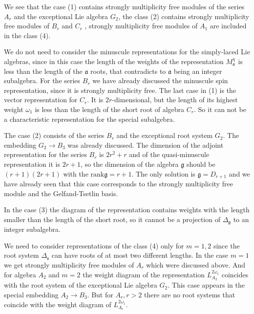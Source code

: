 \documentclass[12pt]{iopart}
\newcommand{\gf}{\mathfrak{g}}
\newcommand{\af}{\mathfrak{a}}
\newcommand{\sfr}{\mathfrak{s}}
\begin{document}
We see that the case (1) contains strongly multiplicity free modules of the series $A_{r}$ and the exceptional
Lie algebra $G_{2}$, the class (2) contains strongly multiplicity free modules of $ B_{r}$ and $C_{r}$ ,
strongly multiplicity free modules of $A_{1}$ are included in the class (4).

We do not need to consider the minuscule representations for the simply-laced Lie algebras, since in this
case the length of the weights of the representation $M^{\chi}_{\af}$ is less than the length of the $\af$ roots,
that contradicts to $\af$ being an integer subalgebra. For the series $B_{r}$ we have already
discussed the minuscule spin representation, since it is strongly multiplicity free. The last case in
(1) is the vector representation for $C_{r}$. It is $2r$-dimensional, but the length of its highest weight $\omega_{1}$ is less
than the length of the short root of algebra $C_{r}$. So it can not be a characteristic representation
for the special subalgebra. 

The case (2) consists of the series $B_{r}$ and the exceptional root system $G_{2}$. The embedding $G_{2}\to
B_{3}$ was already discussed. 
 The dimension of the adjoint representation for the series $B_{r}$
is $2r^{2}+r$ and of the quasi-minuscule representation it is $2r+1$, so the dimension of the algebra
$\gf$ should be $(r+1)(2r+1)$ with the $\mathrm{rank}\gf=r+1$. The only solution is $\gf=D_{r+1}$
and we have already seen that this case corresponds to the strongly multiplicity free module and
the Gelfand-Tsetlin basis.

In the case (3) the diagram of the representation contains weights with the length smaller than the
length of the short root, so it cannot be a projection of $\Delta_{\gf}$ to an integer subalgebra. 

We need to consider representations of the class (4) only for $m=1,2$ since the root system $\Delta_{\sfr}$
can have roots of at most two different lengths. In the case $m=1$ we get strongly multiplicity free
modules of $A_{r}$ which were discussed above. And for algebra $A_{2}$ and $m=2$ the weight diagram
of the representation $L^{2\omega_{1}}_{A_{2}}$ coincides with the root system of the exceptional Lie algebra
$G_{2}$. This case appears in the special embedding $A_{2}\to B_{3}$. But for $A_{r}, r>2$ there are
no root systems that coincide with the weight diagram of $L^{2\omega_{1}}_{A_{r}}$. 
\end{document}
